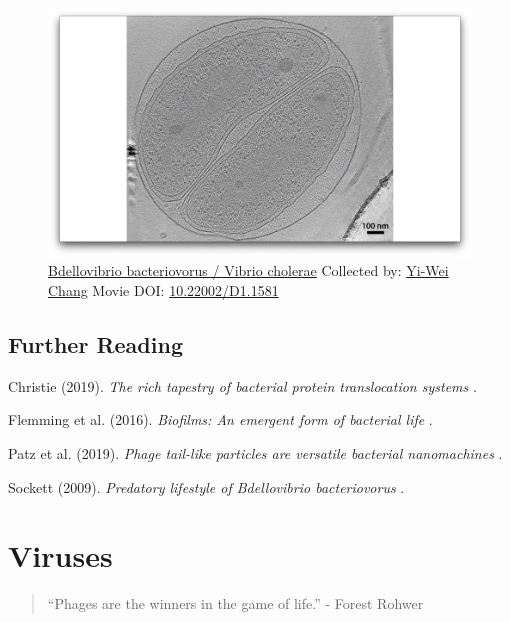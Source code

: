 \documentclass[]{tufte-book}
\begin{document}
\begin{figure}
\includegraphics{movie_stills/9_11} \caption[\protect\hyperlink{tree}{Bdellovibrio bacteriovorus / Vibrio
cholerae} Collected by: \protect\hyperlink{yi-wei_chang}{Yi-Wei Chang}
Movie DOI: \href{https://doi.org/10.22002/D1.1581}{10.22002/D1.1581}]{\protect\hyperlink{tree}{Bdellovibrio bacteriovorus / Vibrio
cholerae} Collected by: \protect\hyperlink{yi-wei_chang}{Yi-Wei Chang}
Movie DOI: \href{https://doi.org/10.22002/D1.1581}{10.22002/D1.1581}}\label{fig:9-11}
\end{figure}

\section{Further Reading}\label{further-reading}

Christie (2019). \emph{The rich tapestry of bacterial protein
translocation systems} \citep{christie2019}.

Flemming et al. (2016). \emph{Biofilms: An emergent form of bacterial
life} \citep{flemming2016}.

Patz et al. (2019). \emph{Phage tail-like particles are versatile
bacterial nanomachines} \citep{patz2019}.

Sockett (2009). \emph{Predatory lifestyle of Bdellovibrio bacteriovorus}
\citep{sockett2009}.

\chapter{Viruses}\label{viruses}

\begin{quote}
``Phages are the winners in the game of life.'' - Forest Rohwer
\citep{rohwer2014}
\end{quote}
\end{document}
